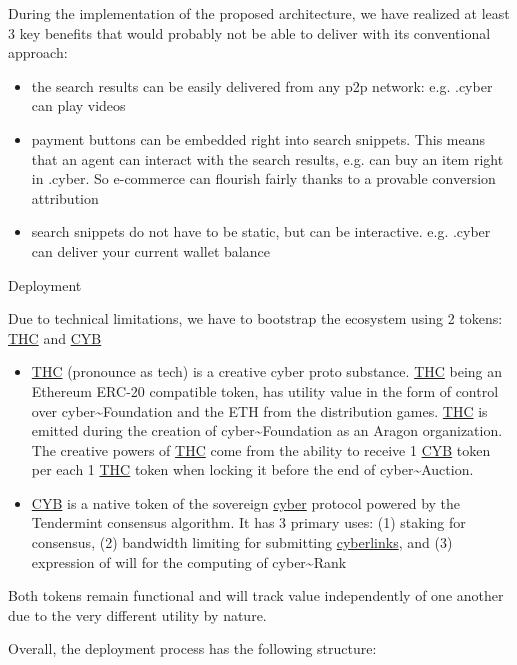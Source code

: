 \documentclass[8pt,oneside]{amsart}
\makeatletter
\newcommand{\linkred}[2]{\href{#1}{\color{red}{#2}}}
\renewcommand\subsection{\@startsection{subsection}
                                    {2}{\z@}
                                    {-3.25ex\@plus -1ex \@minus -.2ex}
                                    {0ex \@plus .2ex}
                                    {\play\Large}
                        }
\newcommand{\titleSection}[1]{\subsection{#1}}
\makeatother
\begin{document}
During the implementation of the proposed architecture, we have realized at least 3 key benefits that \linkred{https://google.com}{Google} would probably not be able to deliver with its conventional approach:

\begin{itemize}
\item the search results can be easily delivered from any p2p network: e.g. .cyber can play videos
\item payment buttons can be embedded right into search snippets. This means that an agent can interact with the search results, e.g. can buy an item right in .cyber. So e-commerce can flourish fairly thanks to a provable conversion attribution
\item search snippets do not have to be static, but can be interactive. e.g. .cyber can deliver your current wallet balance
\end{itemize}

\titleSection{Deployment}\label{deployment}

Due to technical limitations, we have to bootstrap the ecosystem using 2 tokens: {\hyperref[thc]{THC}} and {\hyperref[cyb]{CYB}}

\begin{itemize}
\item {\hyperref[thc]{THC}} (pronounce as tech) is a creative cyber proto substance. {\hyperref[thc]{THC}} being an Ethereum ERC-20 compatible token, has utility value in the form of control over cyber\~{}Foundation and the ETH from the distribution games. {\hyperref[thc]{THC}} is emitted during the creation of cyber\~{}Foundation as an Aragon organization. The creative powers of {\hyperref[thc]{THC}} come from the ability to receive 1 {\hyperref[cyb]{CYB}} token per each 1 {\hyperref[thc]{THC}} token when locking it before the end of cyber\~{}Auction.
\item {\hyperref[cyb]{CYB}} is a native token of the sovereign {\hyperref[cyber]{cyber}} protocol powered by the Tendermint consensus algorithm. It has 3 primary uses: (1) staking for consensus, (2) bandwidth limiting for submitting {\hyperref[cyberlinks]{cyberlinks}}, and (3) expression of will for the computing of cyber\~{}Rank
\end{itemize}

Both tokens remain functional and will track value independently of one another due to the very different utility by nature.

Overall, the deployment process has the following structure:
\end{document}
